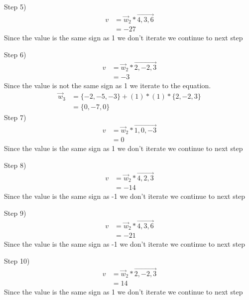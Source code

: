 \documentclass[12pt,english]{article}
\begin{document}
Step 5)
\begin{equation*}
\begin{split}
v&= \vec{w}_2 * \vec{4,3,6}\\
&= -27
\end{split}
\end{equation*}
Since the value is the same sign as 1 we don't iterate we continue to next step\par

Step 6)
\begin{equation*}
\begin{split}
v&= \vec{w}_2* \vec{2,-2,3}\\
&= -3
\end{split}
\end{equation*}
Since the value is not the same sign as 1 we iterate to the equation.
\begin{equation}\tag{2}
\begin{split}
\vec{w}_{3} &= \{-2,-5,-3\}+ (1) * (1) * \{2,-2,3 \}\\
&= \{0,-7,0 \}
\end{split}
\end{equation}
Step 7)
\begin{equation*}
\begin{split}
v&= \vec{w}_2* \vec{1,0,-3}\\
&= 0
\end{split}
\end{equation*}
Since the value is the same sign as 1 we don't iterate we continue to next step\par

Step 8)
\begin{equation*}
\begin{split}
v&= \vec{w}_2* \vec{4,2,3}\\
&= -14
\end{split}
\end{equation*}
Since the value is the same sign as -1 we don't iterate we continue to next step\par

Step 9)
\begin{equation*}
\begin{split}
v&= \vec{w}_2* \vec{4,3,6}\\
&= -21
\end{split}
\end{equation*}
Since the value is the same sign as -1 we don't iterate we continue to next step\par

Step 10)
\begin{equation*}
\begin{split}
v&= \vec{w}_2* \vec{2,-2,3}\\
&= 14
\end{split}
\end{equation*}
Since the value is the same sign as 1 we don't iterate we continue to next step\par
\end{document}
